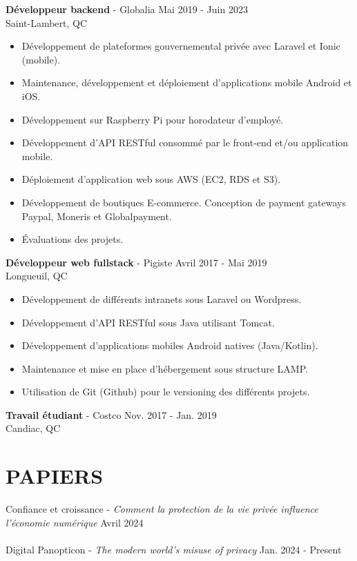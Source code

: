 \documentclass[margin, 10pt]{res} %
\begin{document}
\begin{resume}
{\textbf{Développeur backend} - Globalia} \hfill Mai 2019 - Juin 2023 \\
Saint-Lambert, QC
\begin{itemize}
\item Développement de plateformes gouvernemental privée avec Laravel et Ionic (mobile).
\item Maintenance, développement et déploiement d'applications mobile Android et iOS.
\item Développement sur Raspberry Pi pour horodateur d'employé.
\item Développement d'API RESTful consommé par le front-end et/ou application mobile.
\item Déploiement d'application web sous AWS (EC2, RDS et S3).
\item Développement de boutiques E-commerce. Conception de payment gateways Paypal, Moneris et Globalpayment.
\item Évaluations des projets.
\end{itemize} 

{\textbf{Développeur web fullstack} - Pigiste} \hfill Avril 2017 - Mai 2019 \\
Longueuil, QC
\begin{itemize}
\item Développement de différents intranets sous Laravel ou Wordpress.
\item Développement d'API RESTful sous Java utilisant Tomcat.
\item Développement d'applications mobiles Android natives (Java/Kotlin).
\item Maintenance et mise en place d'hébergement sous structure LAMP.
\item Utilisation de Git (Github) pour le versioning des différents projets.
\end{itemize} 

{\textbf{Travail étudiant} - Costco} \hfill Nov. 2017 - Jan. 2019 \\
Candiac, QC

\section{PAPIERS}

{Confiance et croissance - \sl Comment la protection de la vie privée influence l'économie numérique} \hfill Avril 2024 \\\\
{Digital Panopticon - \sl The modern world's misuse of privacy} \hfill Jan. 2024 - Present \\


\end{resume}
\end{document}
